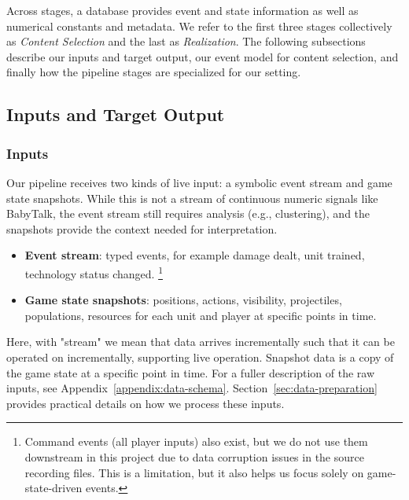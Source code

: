 Across stages, a database provides event and state information as well as numerical constants and metadata. We refer to the first three stages collectively as \textit{Content Selection} and the last as \textit{Realization}. The following subsections describe our inputs and target output, our event model for content selection, and finally how the pipeline stages are specialized for our setting.

\subsection{Inputs and Target Output}
\subsubsection*{Inputs}
Our pipeline receives two kinds of live input: a symbolic event stream and game state snapshots. While this is not a stream of continuous numeric signals like BabyTalk, the event stream still requires analysis (e.g., clustering), and the snapshots provide the context needed for interpretation.
\begin{itemize}
  \item \textbf{Event stream}: typed events, for example damage dealt, unit trained, technology status changed. \footnote{Command events (all player inputs) also exist, but we do not use them downstream in this project due to data corruption issues in the source recording files. This is a limitation, but it also helps us focus solely on game-state-driven events.}
  \item \textbf{Game state snapshots}: positions, actions, visibility, projectiles, populations, resources for each unit and player at specific points in time.
\end{itemize}
Here, with "stream" we mean that data arrives incrementally such that it can be operated on incrementally, supporting live operation. Snapshot data is a copy of the game state at a specific point in time. For a fuller description of the raw inputs, see Appendix~\ref{appendix:data-schema}. Section~\ref{sec:data-preparation} provides practical details on how we process these inputs.

